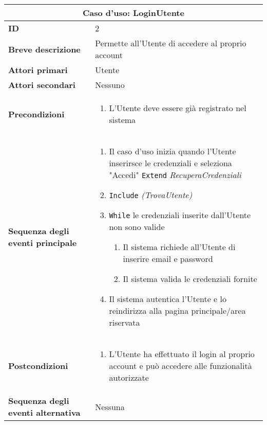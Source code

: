 \documentclass[a4paper]{report}
\begin{document}
\clearpage
\begin{table}[t!]
\vspace*{-9cm}
\renewcommand{\arraystretch}{1.9}
\begin{tabular}{|p{3.9cm}|p{9.9cm}|}
\hline
\multicolumn{2}{|c|}{\textbf{Caso d’uso: LoginUtente}} \\ \hline
\textbf{ID} & 2 \\ \hline
\textbf{Breve descrizione} &  Permette all’Utente di accedere al proprio account\\ \hline
\textbf{Attori primari} & Utente \\ \hline
\textbf{Attori secondari} & Nessuno \\ \hline
\textbf{Precondizioni} & \begin{enumerate}[leftmargin=14pt,label=\arabic*.,labelsep=0.5em,topsep=0pt,partopsep=0pt,parsep=0pt,itemsep=0pt]
    \item L’Utente deve essere già registrato nel sistema 
\end{enumerate}\\ \hline
\textbf{Sequenza degli eventi principale} & \begin{enumerate}[leftmargin=14pt,label=\arabic*.,labelsep=0.5em,topsep=0pt,partopsep=0pt,parsep=0pt,itemsep=0pt]
    \item Il caso d’uso inizia quando l’Utente inserirsce le credenziali e seleziona "Accedi" \newline \texttt{Extend} \textit{RecuperaCredenziali}
    \item \texttt{Include} \textit{(TrovaUtente)}
    \item \texttt{While} le credenziali inserite dall’Utente non sono valide
    \begin{enumerate}[label=\arabic{enumi}.\arabic*.,leftmargin=22pt,labelsep=0.5em,topsep=0pt,partopsep=0pt,parsep=0pt,itemsep=0pt]
        \item Il sistema richiede all’Utente di inserire email e password
        \item Il sistema valida le credenziali fornite
    \end{enumerate}
    \item Il sistema autentica l’Utente e lo reindirizza alla pagina principale/area riservata
\end{enumerate}\\ \hline
\textbf{Postcondizioni} & \begin{enumerate}[leftmargin=14pt,label=\arabic*.,labelsep=0.5em,topsep=0pt,partopsep=0pt,parsep=0pt,itemsep=0pt]
    \item L’Utente ha effettuato il login al proprio account e può accedere alle funzionalità autorizzate
    \end{enumerate} \\ \hline
\textbf{Sequenza degli eventi alternativa} & Nessuna \\ \hline
\end{tabular}
\end{table}
\end{document}
